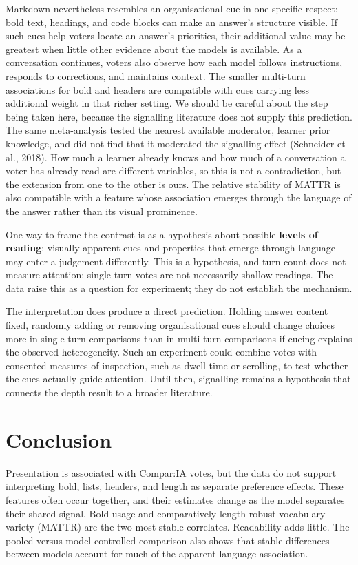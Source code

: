 \documentclass[
]{article}
\begin{document}
Markdown nevertheless resembles an organisational cue in one specific
respect: bold text, headings, and code blocks can make an answer's
structure visible. If such cues help voters locate an answer's
priorities, their additional value may be greatest when little other
evidence about the models is available. As a conversation continues,
voters also observe how each model follows instructions, responds to
corrections, and maintains context. The smaller multi-turn associations
for bold and headers are compatible with cues carrying less additional
weight in that richer setting. We should be careful about the step being
taken here, because the signalling literature does not supply this
prediction. The same meta-analysis tested the nearest available
moderator, learner prior knowledge, and did not find that it moderated
the signalling effect (Schneider et al., 2018). How much a learner
already knows and how much of a conversation a voter has already read
are different variables, so this is not a contradiction, but the
extension from one to the other is ours. The relative stability of MATTR is also
compatible with a feature whose association emerges through the
language of the answer rather than its visual prominence.

One way to frame the contrast is as a hypothesis about possible
\textbf{levels of reading}: visually apparent cues and properties that
emerge through language may enter a judgement differently. This is a
hypothesis, and turn count does not measure attention: single-turn votes
are not necessarily shallow readings. The data raise this as a question
for experiment; they do not establish the mechanism.

The interpretation does produce a direct prediction. Holding answer
content fixed, randomly adding or removing organisational cues should
change choices more in single-turn comparisons than in multi-turn
comparisons if cueing explains the observed heterogeneity. Such an
experiment could combine votes with consented measures of inspection,
such as dwell time or scrolling, to test whether the cues actually guide
attention. Until then, signalling remains a hypothesis that connects
the depth result to a broader literature.

\section{Conclusion}\label{conclusion}

Presentation is associated with Compar:IA votes, but the data do not
support interpreting bold, lists, headers, and length as separate
preference effects. These features often occur together,
and their estimates change as the model separates their shared signal.
Bold usage and comparatively length-robust vocabulary variety (MATTR)
are the two most stable correlates. Readability adds little. The
pooled-versus-model-controlled comparison also shows that stable
differences between models account for much of the apparent language
association.
\end{document}
